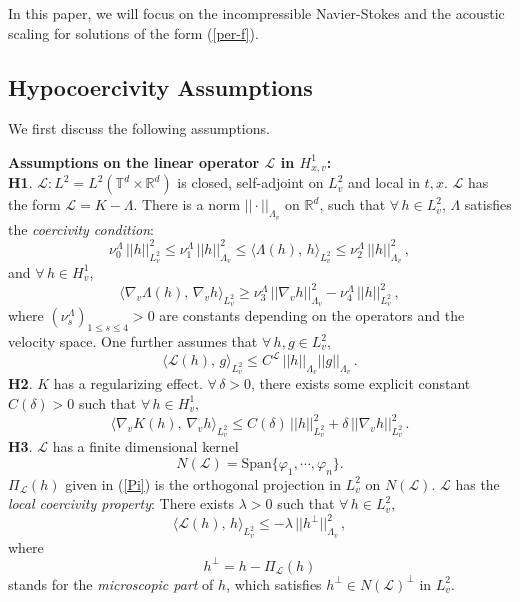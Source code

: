 \documentclass[final,onefignum,onetabnum]{siamart171218}
\begin{document}
In this paper, we will focus on the incompressible Navier-Stokes and the
acoustic scaling for solutions of the form (\ref{per-f}).

\subsection{Hypocoercivity Assumptions}
\label{sec1}
We first discuss the following assumptions. 

{\bf Assumptions on the linear operator $\mathcal L$ in $H^1_{x,v}$: } \\
{\bf H1}. $\mathcal L: L^2=L^2(\mathbb T^d \times{\mathbb R^d})$ is closed, self-adjoint on $L^2_v$ and local in $t,x$.
$\mathcal L$ has the form $\mathcal L=K-\Lambda$. There is a norm $||\cdot||_{\Lambda_v}$ on $\mathbb R^d$, such that $\forall\,  h\in L^2_v$,
$\Lambda$ satisfies the {\it coercivity condition}: \begin{equation}\label{H1_1}\nu_0^{\Lambda}\,  ||h||_{L^2_v}^2 \leq \nu_1^{\Lambda}\, ||h||_{\Lambda_v}^2 \leq \langle \Lambda(h),\,h\rangle_{L^2_v}\leq \nu_2^{\Lambda}\,  ||h||_{\Lambda_v}^2\,, \end{equation}
and $\forall\, h\in H^1_{v}$,
\begin{equation}\label{H1}\langle \nabla_v \Lambda(h), \,\nabla_v h\rangle_{L^2_v} \geq \nu_3^{\Lambda}\, ||\nabla_v h||_{\Lambda_v}^2 - \nu_4^{\Lambda}\, ||h||_{L^2_v}^2\,,  \end{equation}
where $(\nu_s^{\Lambda})_{1\leq s\leq 4}>0$ are constants depending on the operators and the velocity space.
One further assumes that $\forall\, h, g\in L^2_v$,
\begin{equation}\label{LL}\langle\mathcal L(h), \, g\rangle_{L^2_v}\leq C^{\mathcal L}\, ||h||_{\Lambda_v}||g||_{\Lambda_v}\,.\end{equation}
{\bf H2}. $K$ has a regularizing effect. $\forall\, \delta>0$, there exists some explicit constant $C(\delta)>0$ such that $\forall\, h\in H_v^1$,
\begin{equation}\label{H2}\langle\nabla_v K(h), \, \nabla_v h\rangle_{L^2_v} \leq C(\delta)\, ||h||_{L^2_v}^2 + \delta\, ||\nabla_v h||_{L^2_v}^2\,.
\end{equation}
{\bf H3}. $\mathcal L$ has a finite dimensional kernel $$N(\mathcal L)=\text{Span}\{\varphi_1, \cdots, \varphi_n\}.$$
$\Pi_{\mathcal L}(h)$ given in (\ref{Pi}) is the orthogonal projection in $L^2_v$ on $N(\mathcal L)$. $\mathcal L$ has the {\it local coercivity property}:
There exists $\lambda>0$ such that $\forall\, h\in L^2_v$,
\begin{equation}\label{coercivity}\langle\mathcal L(h),\, h\rangle_{L^2_v} \leq -\lambda\, ||h^{\perp}||_{\Lambda_v}^2\,, \end{equation}
where $$h^{\perp}=h-\Pi_{\mathcal L}(h)$$ stands for the {\it microscopic part} of $h$, which satisfies $h^{\perp}\in N(\mathcal L)^{\perp}$
in $L_v^2$.
\end{document}
